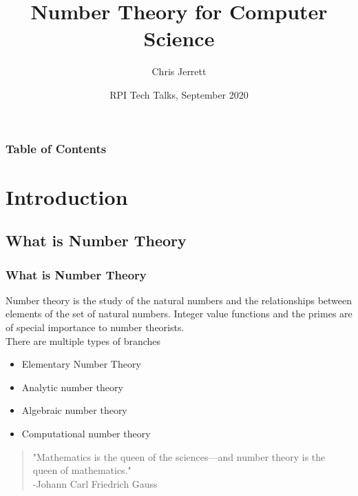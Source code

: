 \documentclass{beamer}
\title[Number Theory for Computer Science] %
{Number Theory for Computer Science}
\author[Jerrett] %
{Chris Jerrett\inst{1}}
\institute[RPI] %
{
  \inst{1}%
  Department of Computer Science
  Rensselaer Polytechnic Institute
}
\date[RPI Tech Talks, 2020] %
{RPI Tech Talks, September 2020}
\begin{document}
\frame{\titlepage}


\begin{frame}
\frametitle{Table of Contents}
\tableofcontents
\end{frame}


\section{Introduction}

\subsection{What is Number Theory}

\begin{frame}
\frametitle{What is Number Theory}
Number theory is the study of the natural numbers and the relationships between elements of the set of natural numbers. Integer value functions and the primes are of special importance to number theorists.
\vspace{20pt}
\pause
\\There are multiple types of branches 
\begin{itemize}
 \item<2-> Elementary Number Theory
 \item<3-> Analytic number theory
 \item<4-> Algebraic number theory
 \item<5-> Computational number theory
\end{itemize}
\pause
\vspace{10pt}
\begin{block}{}
\begin{quote}
"Mathematics is the queen of the sciences—and number theory is the queen of mathematics."
\\-Johann Carl Friedrich Gauss
\end{quote}
\end{block}
\end{frame}
\end{document}

